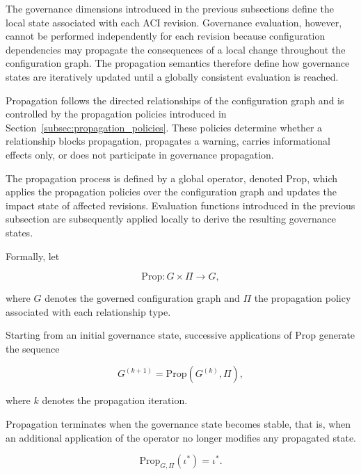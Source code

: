 \documentclass[10pt]{article}
\begin{document}
	The governance dimensions introduced in the previous subsections define the
	local state associated with each ACI revision. Governance evaluation, however,
	cannot be performed independently for each revision because configuration
	dependencies may propagate the consequences of a local change throughout the
	configuration graph. The propagation semantics therefore define how governance
	states are iteratively updated until a globally consistent evaluation is
	reached.
	
	Propagation follows the directed relationships of the configuration graph and
	is controlled by the propagation policies introduced in
	Section~\ref{subsec:propagation_policies}. These policies determine whether a
	relationship blocks propagation, propagates a warning, carries informational
	effects only, or does not participate in governance propagation.
	
	The propagation process is defined by a global operator,
	denoted $\mathrm{Prop}$, which applies the propagation policies over the
	configuration graph and updates the impact state of affected revisions.
	Evaluation functions introduced in the previous subsection are subsequently
	applied locally to derive the resulting governance states.
	
	Formally, let
	
	\begin{equation}
		\label{eq:prop_operator}
		\mathrm{Prop} :
		G \times \Pi
		\rightarrow
		G,
	\end{equation}
	
	where $G$ denotes the governed configuration graph and $\Pi$ the propagation
	policy associated with each relationship type.
	
	Starting from an initial governance state, successive applications of
	$\mathrm{Prop}$ generate the sequence
	
	\begin{equation}
		\label{eq:prop_iteration}
		G^{(k+1)}
		=
		\mathrm{Prop}
		\!\left(
		G^{(k)},
		\Pi
		\right),
	\end{equation}
	
	where $k$ denotes the propagation iteration.
	
	Propagation terminates when the governance state becomes stable, that is, when
	an additional application of the operator no longer modifies any propagated
	state.
	
\begin{equation}
	\label{eq:fixed_point}
	\mathrm{Prop}_{G,\Pi}
	\!\left(
	\iota^{*}
	\right)
	=
	\iota^{*}.
\end{equation}
\end{document}
